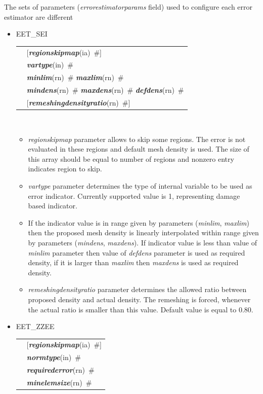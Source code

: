 \documentclass[a4paper]{article}
\makeatletter
\newcommand{\param}[1]{{\em #1}}
\newcommand{\keywordnotype}[1]{\mbox{{\it{\bf{#1}}}}}
\newcommand{\keyword}[2]{\mbox{{\keywordnotype{#1}\tiny (#2)}}}
\newcommand{\field}[2]{\mbox{\keyword{#1}{#2}~\#}}
\newcommand{\optField}[2]{\mbox{[\field{#1}{#2}]}}
\newenvironment{record}[1][]{\begin{tabular}{|ll}}{\end{tabular}\\}
\newcommand{\recentry}[2]{{#1}&{#2}\\}
\newcounter{rcc}
\newenvironment{record}[1][\textwidth]{\setcounter{rcc}{0}\begin{tabular*}{#1}{|ll@{\extracolsep{\fill}}r}}{\end{tabular*}\\}
\newcommand{\recentry}[2]{\ifthenelse{\value{rcc}>0}{&$\backslash$ \\}{\setcounter{rcc}{1}}{#1}&{#2}}
\makeatother
\begin{document}
The sets of parameters (\param{errorestimatorparams} field) used to
configure each error estimator are different 
\begin{itemize}
\item
EET\_SEI\\
\begin{record}[0.9\textwidth]
\recentry{\hspace{2cm}}{\optField{regionskipmap}{ia}} \recentry{}{\field{vartype}{in}}
\recentry{}{\field{minlim}{rn} \field{maxlim}{rn}} 
\recentry{}{\field{mindens}{rn} \field{maxdens}{rn} \field{defdens}{rn}}
\recentry{}{\optField{remeshingdensityratio}{rn}}
\end{record}
\begin{itemize}
\item \param{regionskipmap} parameter allows to skip some regions. The
error is not evaluated in these regions and default mesh density is
used. The size of this array should be equal to number of regions and
nonzero entry indicates region to skip.
\item \param{vartype} parameter determines the type of internal
variable to be used as error indicator. Currently supported value is
1, representing damage based indicator.
\item If the indicator value is in range given by parameters (\param{minlim},
 \param{maxlim}) then the proposed mesh density is linearly
interpolated within range given by parameters (\param{mindens}, \param{maxdens}). If
indicator value is less than value of \param{minlim} parameter then
value of \param{defdens} parameter is used as 
required density, if it is larger than \param{maxlim} then
\param{maxdens} is used as required density. 
\item
\param{remeshingdensityratio} parameter determines the allowed ratio
between proposed density and actual density.
The remeshing is forced, whenever the actual ratio is smaller than
this value. Default value is equal to 0.80.
\end{itemize}
\item
EET\_ZZEE\\
\begin{record}[0.9\textwidth]
\recentry{\hspace{2cm}}{\optField{regionskipmap}{ia}}
\recentry{}{\field{normtype}{in}}
\recentry{}{\field{requirederror}{rn}} \recentry{}{\field{minelemsize}{rn}}
\end{record}


\end{itemize}
\end{document}
